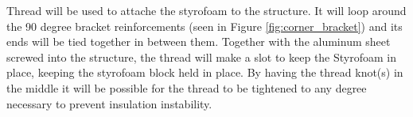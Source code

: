
Thread will be used to attache the styrofoam to the structure. It will loop around the 90 degree bracket reinforcements (seen in Figure \ref{fig:corner_bracket}) and its ends will be tied together in between them. Together with the aluminum sheet screwed into the structure, the thread will make a slot to keep the Styrofoam in place, keeping the styrofoam block held in place. By having the thread knot(s) in the middle it will be possible for the thread to be tightened to any degree necessary to prevent insulation instability.
